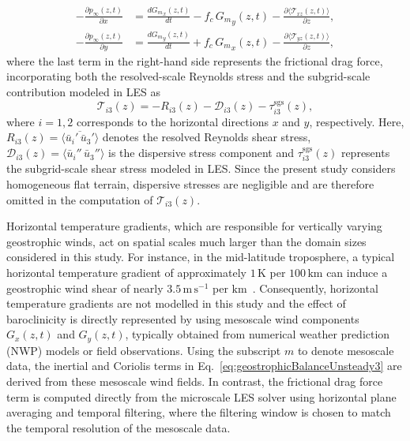 \begin{equation}
\begin{aligned}
    -\frac{\partial p_\infty(z,t)}{\partial x} 
    &= \frac{d{G_m}_x(z,t)}{dt} 
    - f_c\,{G_m}_y(z,t) 
    - \frac{\partial \langle \mathcal{T}_{xz}(z,t) \rangle}{\partial z}, \\
    -\frac{\partial p_\infty(z,t)}{\partial y} 
    &= \frac{d{G_m}_y(z,t)}{dt}
    + f_c\,{G_m}_x(z,t) 
    - \frac{\partial \langle \mathcal{T}_{yz}(z,t) \rangle}{\partial z},
\end{aligned}
\label{eq:geostrophicBalanceUnsteady3}
\end{equation}
%
where the last term in the right-hand side represents the frictional drag force, incorporating both the resolved-scale Reynolds stress and the subgrid-scale contribution modeled in LES as
\begin{equation}
\mathcal{T}_{i3}(z) = -R_{i3}(z)  - \mathcal{D}_{i3}(z) - \tau_{i3}^{\mathrm{sgs}}(z),
\label{eq:totalShearStress}
\end{equation}
where \(i = 1,2\) corresponds to the horizontal directions \(x\) and \(y\), respectively. Here, \(R_{i3}(z) = \langle \overline{\bar{u}_i'\,\bar{u}_3'} \rangle\) denotes the resolved Reynolds shear stress, $\mathcal{D}_{i3}(z) = \bigl\langle \bar{u}_i''\,\bar{u}_3''\bigr\rangle$ is the dispersive stress component and \(\tau_{i3}^{\mathrm{sgs}}(z)\) represents the subgrid-scale shear stress modeled in LES. Since the present study considers homogeneous flat terrain, dispersive stresses are negligible and are therefore omitted in the computation of \(\mathcal{T}_{i3}(z)\). 

Horizontal temperature gradients, which are responsible for vertically varying geostrophic winds, act on spatial scales much larger than the domain sizes considered in this study. For instance, in the mid-latitude troposphere, a typical horizontal temperature gradient of approximately \(1\,\mathrm{K}\) per \(100\,\mathrm{km}\) can induce a geostrophic wind shear of nearly \(3.5\,\mathrm{m\,s^{-1}}\) per \(\mathrm{km}\)~\citep{sorbjan2004large}. Consequently, horizontal temperature gradients are not modelled in this study and the effect of baroclinicity is directly represented by using mesoscale wind components \( G_{x}(z,t) \) and \( G_{y}(z,t) \), typically obtained from numerical weather prediction (NWP) models or field observations. Using the subscript \( m \) to denote mesoscale data, the inertial and Coriolis terms in Eq.~\ref{eq:geostrophicBalanceUnsteady3} are derived from these mesoscale wind fields. In contrast, the frictional drag force term is computed directly from the microscale LES solver using horizontal plane averaging and temporal filtering, where the filtering window is chosen to match the temporal resolution of the mesoscale data. 

